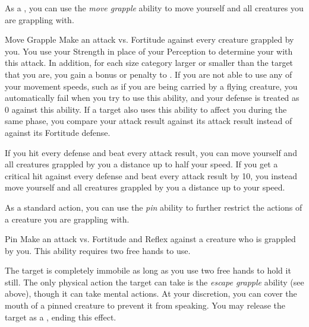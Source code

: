              As a , you can use the \textit{move grapple} ability to move yourself and all creatures you are grappling with.

            \begin{freeability}{Move Grapple}
                Make an attack vs. Fortitude against every creature grappled by you.
                You use your Strength in place of your Perception to determine your  with this attack.
                In addition, for each size category larger or smaller than the target that you are, you gain a  bonus or penalty to .
                If you are not able to use any of your movement speeds, such as if you are being carried by a flying creature, you automatically fail when you try to use this ability, and your defense is treated as 0 against this ability.
                If a target also uses this ability to affect you during the same phase, you compare your attack result against its attack result instead of against its Fortitude defense.

                If you hit every defense and beat every attack result, you can move yourself and all creatures grappled by you a distance up to half your speed.
                If you get a critical hit against every defense and beat every attack result by 10, you instead move yourself and all creatures grappled by you a distance up to your speed.
            \end{freeability}

            \label{Pin} As a standard action, you can use the \textit{pin} ability to further restrict the actions of a creature you are grappling with.

            \begin{freeability}{Pin}
                Make an attack vs. Fortitude and Reflex against a creature who is grappled by you.
                This ability requires two free hands to use.

                \hit The target is completely immobile as long as you use two free hands to hold it still.
                The only physical action the target can take is the \textit{escape grapple} ability (see above), though it can take mental actions.
                At your discretion, you can cover the mouth of a pinned creature to prevent it from speaking.
                You may release the target as a , ending this effect.
            \end{freeability}


